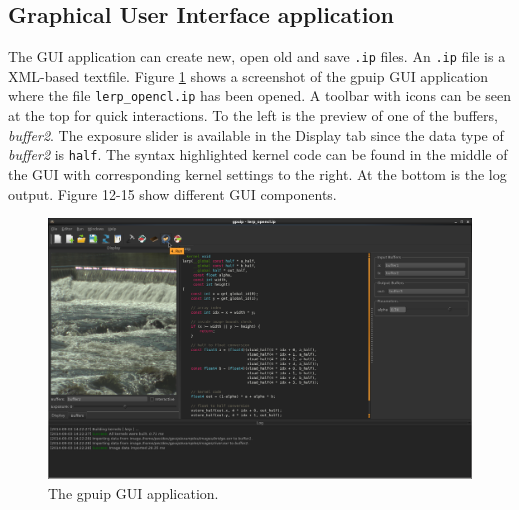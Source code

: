 \newpage
\subsection{Graphical User Interface application}

The GUI application can create new, open old and save {\tt .ip} files. An {\tt .ip} file is a XML-based textfile. Figure \ref{gpuipgui} shows a screenshot of the gpuip GUI application where the file {\tt lerp\_opencl.ip} has been opened. A toolbar with icons can be seen at the top for quick interactions. To the left is the preview of one of the buffers, \emph{buffer2}. The exposure slider is available in the Display tab since the data type of  \emph{buffer2} is {\tt half}. The syntax highlighted kernel code can be found in the middle of the GUI with corresponding kernel settings to the right. At the bottom is the log output. Figure 12-15 show different GUI components.

\begin{center}
\begin{figure}[ht!]
\centering
\includegraphics[width=140mm]{img/gpuip.png}
\caption{The gpuip GUI application.}
\label{gpuipgui}
\end{figure}
\end{center}

